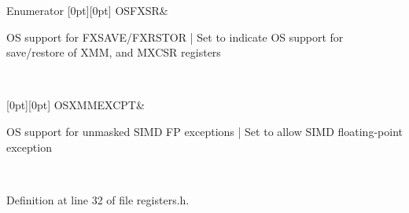 \begin{DoxyEnumFields}{Enumerator}
[0pt][0pt]{}\mbox{\label{namespace_c_r4_a2928f19d113bac6aaeab713b170185ceab0cf978bb5b8c32070363ab81d327c53}} 
O\+S\+F\+X\+SR&
\begin{DoxyPre}OS support for FXSAVE/FXRSTOR              | Set to indicate OS support for save/restore of XMM, and MXCSR registers \end{DoxyPre}
 \\
\hline

[0pt][0pt]{}\mbox{\label{namespace_c_r4_a2928f19d113bac6aaeab713b170185ceabb68ec0930317011b84484346947f472}} 
O\+S\+X\+M\+M\+E\+X\+C\+PT&
\begin{DoxyPre}OS support for unmasked SIMD FP exceptions | Set to allow SIMD floating-point exception \end{DoxyPre}
 \\
\hline

\end{DoxyEnumFields}


Definition at line 32 of file registers.\+h.

